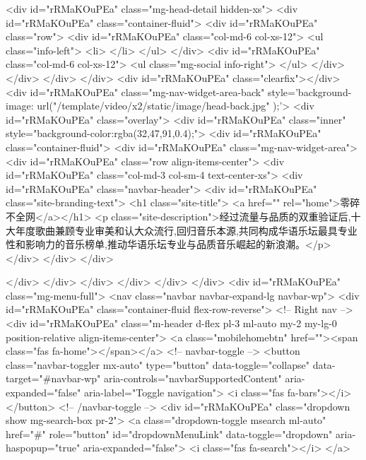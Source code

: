     <div id="rRMaKOuPEa"  class="mg-head-detail hidden-xs">
        <div id="rRMaKOuPEa"  class="container-fluid">
            <div id="rRMaKOuPEa"  class="row">
                <div id="rRMaKOuPEa"  class="col-md-6 col-xs-12">
                    <ul class="info-left">
                        <li>        </li>
                    </ul>
                </div>
                <div id="rRMaKOuPEa"  class="col-md-6 col-xs-12">
                    <ul class="mg-social info-right">
                    </ul>
                </div>
            </div>
        </div>
    </div>
    <div id="rRMaKOuPEa"  class="clearfix"></div>
    <div id="rRMaKOuPEa"  class="mg-nav-widget-area-back" style='background-image: url("/template/video/x2/static/image/head-back.jpg" );'>
        <div id="rRMaKOuPEa"  class="overlay">
            <div id="rRMaKOuPEa"  class="inner" style="background-color:rgba(32,47,91,0.4);">
                <div id="rRMaKOuPEa"  class="container-fluid">
                    <div id="rRMaKOuPEa"  class="mg-nav-widget-area">
                        <div id="rRMaKOuPEa"  class="row align-items-center">
                            <div id="rRMaKOuPEa"  class="col-md-3 col-sm-4 text-center-xs">
                                <div id="rRMaKOuPEa"  class="navbar-header">
                                    <div id="rRMaKOuPEa"  class="site-branding-text">
                                        <h1 class="site-title"> <a href="" rel="home">零碎不全网</a></h1>
                                        <p class="site-description">经过流量与品质的双重验证后,十大年度歌曲兼顾专业审美和认大众流行,回归音乐本源,共同构成华语乐坛最具专业性和影响力的音乐榜单,推动华语乐坛专业与品质音乐崛起的新浪潮。</p>
                                    </div>
                                </div>
                            </div>

                        </div>
                    </div>
                </div>
            </div>
        </div>
    </div>
    <div id="rRMaKOuPEa"  class="mg-menu-full">
        <nav class="navbar navbar-expand-lg navbar-wp">
            <div id="rRMaKOuPEa"  class="container-fluid flex-row-reverse">
                <!-- Right nav -->
                <div id="rRMaKOuPEa"  class="m-header d-flex pl-3 ml-auto my-2 my-lg-0 position-relative align-items-center">
                    <a class="mobilehomebtn" href=""><span class="fas fa-home"></span></a>
                    <!-- navbar-toggle -->
                    <button class="navbar-toggler mx-auto" type="button" data-toggle="collapse" data-target="#navbar-wp" aria-controls="navbarSupportedContent" aria-expanded="false" aria-label="Toggle navigation">
                        <i class="fas fa-bars"></i>
                    </button>
                    <!-- /navbar-toggle -->
                    <div id="rRMaKOuPEa"  class="dropdown show mg-search-box pr-2">
                        <a class="dropdown-toggle msearch ml-auto" href="#" role="button" id="dropdownMenuLink" data-toggle="dropdown" aria-haspopup="true" aria-expanded="false">
                            <i class="fas fa-search"></i>
                        </a>

